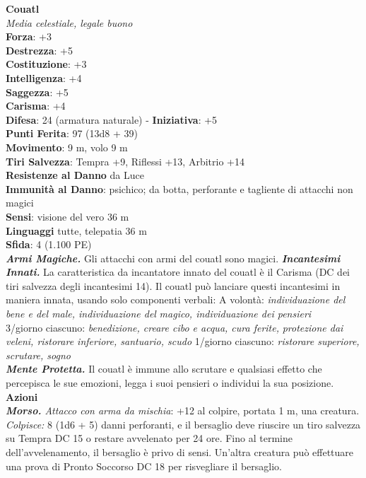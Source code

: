 \begin{multicols}{2}
\medskip\textbf{Couatl}\\
\emph{Media celestiale, legale buono}\\
\textbf{Forza}: +3\\
\textbf{Destrezza}: +5\\
\textbf{Costituzione}: +3\\
\textbf{Intelligenza}: +4\\
\textbf{Saggezza}: +5\\
\textbf{Carisma}: +4\\
\textbf{Difesa}: 24 (armatura naturale) - \textbf{Iniziativa}: +5\\
\textbf{Punti Ferita}: 97 (13d8 + 39)\\
\textbf{Movimento}: 9 m, volo 9 m\\
\textbf{Tiri Salvezza}: Tempra +9, Riflessi +13, Arbitrio +14\\
\textbf{Resistenze al Danno} da Luce\\
\textbf{Immunità al Danno}: psichico; da botta, perforante e tagliente di attacchi non magici\\
\textbf{Sensi}: visione del vero 36 m\\
\textbf{Linguaggi} tutte, telepatia 36 m \\
\textbf{Sfida}: 4 (1.100 PE)\smallskip\\
\emph{\textbf{Armi Magiche.}} Gli attacchi con armi del couatl sono magici.
\emph{\textbf{Incantesimi Innati.}} La caratteristica da incantatore innato del couatl è il Carisma (DC dei tiri salvezza degli incantesimi 14). Il couatl può lanciare questi incantesimi in maniera innata, usando solo componenti verbali:
A volontà: \emph{individuazione del bene e del male, individuazione del} \emph{magico, individuazione dei pensieri}\\
3/giorno ciascuno: \emph{benedizione, creare cibo e acqua, cura ferite,} \emph{protezione dai veleni, ristorare inferiore, santuario, scudo} 1/giorno ciascuno: \emph{ristorare superiore, scrutare, sogno}\\
\emph{\textbf{Mente Protetta.}} Il couatl è immune allo scrutare e qualsiasi effetto che percepisca le sue emozioni, legga i suoi pensieri o individui la sua posizione.\\
\smallskip\textbf{Azioni}\\
\emph{\textbf{Morso.} Attacco con arma da mischia}: +12 al colpire, portata 1 m, una creatura.\\
\emph{Colpisce:} 8 (1d6 + 5) danni perforanti, e il bersaglio deve riuscire un tiro salvezza su Tempra DC  15 o restare avvelenato per 24 ore. Fino al termine dell'avvelenamento, il bersaglio è privo di sensi. Un'altra creatura può effettuare una prova di Pronto Soccorso DC  18 per risvegliare il bersaglio.\\

\end{multicols}
